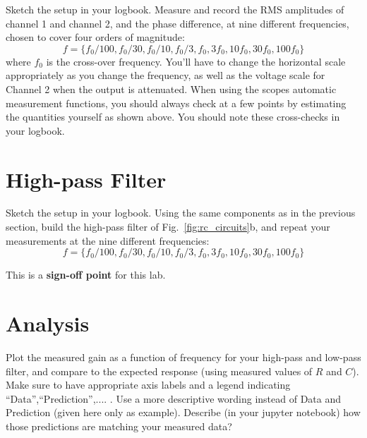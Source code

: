 \begin{measurement} 
Sketch the setup in your logbook. Measure and record the RMS amplitudes of channel 1 and channel 2, and the phase difference, at 
nine different frequencies, chosen to cover four orders of magnitude:
\begin{displaymath}
f=\{f_0/100, f_0/30, f_0/10, f_0/3,f_0, 3f_0, 10f_0, 30f_0, 100f_0\}
\end{displaymath}
where $f_0$ is the cross-over frequency.  You'll have to change the
horizontal scale appropriately as you change the frequency, as well as
the voltage scale for Channel 2 when the output is attenuated.  When
using the scopes automatic measurement functions, you should always
check at a few points by estimating the quantities yourself as shown
above.  You should note these cross-checks in your logbook. \end{measurement}

\section{High-pass Filter}

\begin{measurement} Sketch the setup in your logbook. Using the same components as in the previous section, build the
high-pass filter of Fig.~\ref{fig:rc_circuits}b, and repeat your
measurements at the nine different frequencies:
\begin{displaymath}
f=\{f_0/100, f_0/30, f_0/10, f_0/3,f_0, 3f_0, 10f_0, 30f_0, 100f_0\}
\end{displaymath}
\end{measurement}


\noindent
This is a \textbf{sign-off point} for this lab.

\section{Analysis}

\begin{plot} Plot the measured gain as a function of frequency for your high-pass
and low-pass filter, and compare to the expected response (using measured values of $R$ and $C$). 
Make sure to have
appropriate axis labels and a legend indicating ``Data'',``Prediction'',.... .
Use a more descriptive wording instead of Data and Prediction (given here only as example). 
Describe (in your jupyter notebook) how those predictions are matching your measured data? \end{plot}

